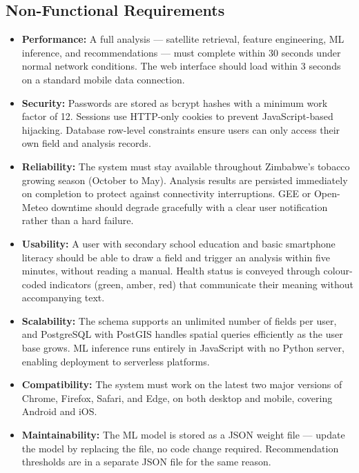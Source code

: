 \documentclass[12pt,a4paper]{report}
\begin{document}
\subsection{Non-Functional Requirements}

\begin{itemize}
  \item \textbf{Performance:} A full analysis — satellite retrieval, feature engineering, ML inference, and recommendations — must complete within 30 seconds under normal network conditions. The web interface should load within 3 seconds on a standard mobile data connection.

  \item \textbf{Security:} Passwords are stored as bcrypt hashes with a minimum work factor of 12. Sessions use HTTP-only cookies to prevent JavaScript-based hijacking. Database row-level constraints ensure users can only access their own field and analysis records.

  \item \textbf{Reliability:} The system must stay available throughout Zimbabwe's tobacco growing season (October to May). Analysis results are persisted immediately on completion to protect against connectivity interruptions. GEE or Open-Meteo downtime should degrade gracefully with a clear user notification rather than a hard failure.

  \item \textbf{Usability:} A user with secondary school education and basic smartphone literacy should be able to draw a field and trigger an analysis within five minutes, without reading a manual. Health status is conveyed through colour-coded indicators (green, amber, red) that communicate their meaning without accompanying text.

  \item \textbf{Scalability:} The schema supports an unlimited number of fields per user, and PostgreSQL with PostGIS handles spatial queries efficiently as the user base grows. ML inference runs entirely in JavaScript with no Python server, enabling deployment to serverless platforms.

  \item \textbf{Compatibility:} The system must work on the latest two major versions of Chrome, Firefox, Safari, and Edge, on both desktop and mobile, covering Android and iOS.

  \item \textbf{Maintainability:} The ML model is stored as a JSON weight file — update the model by replacing the file, no code change required. Recommendation thresholds are in a separate JSON file for the same reason.
\end{itemize}
\end{document}
